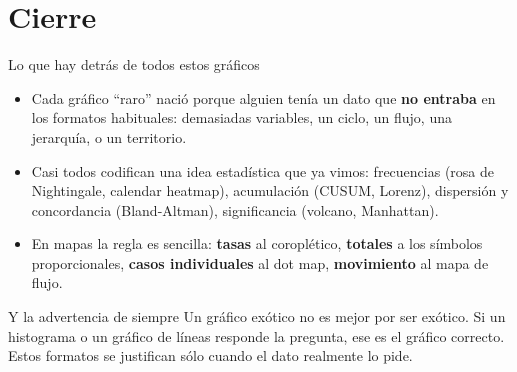 \documentclass[aspectratio=169,9pt]{beamer}
\begin{document}
\section{Cierre}

\begin{frame}{Lo que hay detrás de todos estos gráficos}
\begin{itemize}
\item Cada gráfico ``raro'' nació porque alguien tenía un dato que \textbf{no entraba} en los formatos habituales: demasiadas variables, un ciclo, un flujo, una jerarquía, o un territorio.
\item Casi todos codifican una idea estadística que ya vimos: frecuencias (rosa de Nightingale, calendar heatmap), acumulación (CUSUM, Lorenz), dispersión y concordancia (Bland-Altman), significancia (volcano, Manhattan).
\item En mapas la regla es sencilla: \textbf{tasas} al coroplético, \textbf{totales} a los símbolos proporcionales, \textbf{casos individuales} al dot map, \textbf{movimiento} al mapa de flujo.
\end{itemize}
\vspace{0.5em}
\begin{alertblock}{Y la advertencia de siempre}
Un gráfico exótico no es mejor por ser exótico. Si un histograma o un gráfico de líneas responde la pregunta, ese es el gráfico correcto. Estos formatos se justifican sólo cuando el dato realmente lo pide.
\end{alertblock}
\end{frame}
\end{document}
